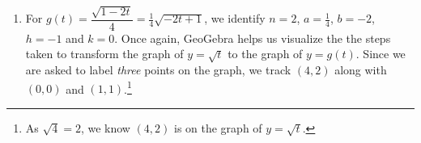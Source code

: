 \documentclass{ximera}
\begin{document}
\begin{example}
\begin{enumerate}









 


 \begin{center}
 \end{center}
 
 We get the domain and range of $f$ are $(-\infty, \infty)$.
 
 \item  For $g(t) = \dfrac{\sqrt{1-2t}}{4} = \frac{1}{4} \sqrt{-2t+1}$, we identify $n=2$, $a = \frac{1}{4}$, $b = -2$, $h = -1$ and $k =0$.  Once again, GeoGebra helps us visualize the the steps taken to transform the graph of $y = \sqrt{t}$ to the graph of $y = g(t)$. Since we are asked to label \textit{three} points on the graph, we track $(4,2)$ along with $(0,0)$ and $(1,1)$.\footnote{As $\sqrt{4} = 2$, we know $(4,2)$ is on the graph of $y = \sqrt{t}$.}



\end{enumerate}
\end{example}
\end{document}
